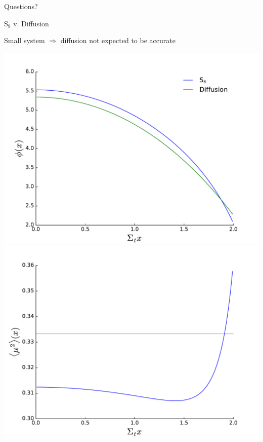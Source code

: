\documentclass[10pt]{beamer}
\begin{document}
\begin{frame}[standout]
  Questions?
\end{frame}

\begin{frame}{S$_8$ v. Diffusion}

	Small system $\Rightarrow$ diffusion not expected to be accurate 
	\begin{center}
	\includegraphics[width=.45\paperwidth]{figs/dvs.pdf}
	\includegraphics[width=.45\paperwidth]{figs/edd.pdf}
	\end{center}

\end{frame}
\end{document}

